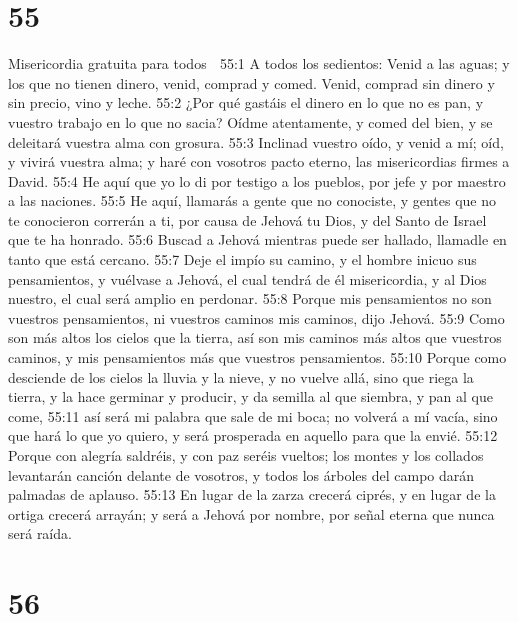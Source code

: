 \chapter{55}

Misericordia gratuita para todos  

55:1 A todos los sedientos: Venid a las aguas; y los que no tienen dinero, venid, comprad y comed. Venid, comprad sin dinero y sin precio, vino y leche.  
55:2 ¿Por qué gastáis el dinero en lo que no es pan, y vuestro trabajo en lo que no sacia? Oídme atentamente, y comed del bien, y se deleitará vuestra alma con grosura.  
55:3 Inclinad vuestro oído, y venid a mí; oíd, y vivirá vuestra alma; y haré con vosotros pacto eterno, las misericordias firmes a David. 
55:4 He aquí que yo lo di por testigo a los pueblos, por jefe y por maestro a las naciones.  
55:5 He aquí, llamarás a gente que no conociste, y gentes que no te conocieron correrán a ti, por causa de Jehová tu Dios, y del Santo de Israel que te ha honrado.  
55:6 Buscad a Jehová mientras puede ser hallado, llamadle en tanto que está cercano.  
55:7 Deje el impío su camino, y el hombre inicuo sus pensamientos, y vuélvase a Jehová, el cual tendrá de él misericordia, y al Dios nuestro, el cual será amplio en perdonar.  
55:8 Porque mis pensamientos no son vuestros pensamientos, ni vuestros caminos mis caminos, dijo Jehová.  
55:9 Como son más altos los cielos que la tierra, así son mis caminos más altos que vuestros caminos, y mis pensamientos más que vuestros pensamientos.  
55:10 Porque como desciende de los cielos la lluvia y la nieve, y no vuelve allá, sino que riega la tierra, y la hace germinar y producir, y da semilla al que siembra, y pan al que come,  
55:11 así será mi palabra que sale de mi boca; no volverá a mí vacía, sino que hará lo que yo quiero, y será prosperada en aquello para que la envié.  
55:12 Porque con alegría saldréis, y con paz seréis vueltos; los montes y los collados levantarán canción delante de vosotros, y todos los árboles del campo darán palmadas de aplauso.  
55:13 En lugar de la zarza crecerá ciprés, y en lugar de la ortiga crecerá arrayán; y será a Jehová por nombre, por señal eterna que nunca será raída.  

\chapter{56}


